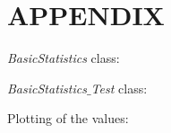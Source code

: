 \documentclass[10pt, a4paper, twocolumn]{article} %
\begin{document}
\newpage

\section*{APPENDIX}

\textit{BasicStatistics} class: 

\newpage

\textit{BasicStatistics$\_$Test} class: 

\newpage

Plotting of the values:






\printbibliography[title={Bibliography}] %

\end{document}
